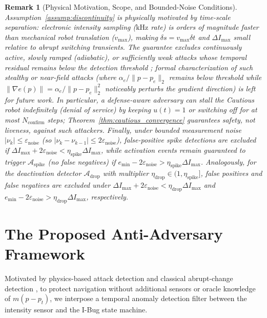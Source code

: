 \documentclass[12pt, a4paper]{article}
\newtheorem{remark}{Remark}
\begin{document}
\begin{remark}[Physical Motivation, Scope, and Bounded-Noise Conditions]
\label{rem:physical_justification}
Assumption~\ref{assump:discontinuity} is physically motivated by time-scale separation: electronic intensity sampling ($\text{kHz}$ rate) is orders of magnitude faster than mechanical robot translation ($v_{\max}$), making $\delta s = v_{\max}\delta t$ and $\Delta I_{\max}$ small relative to abrupt switching transients. The guarantee excludes continuously active, slowly ramped (adiabatic), or sufficiently weak attacks whose temporal residual remains below the detection threshold \cite{psiaki2016gnss}; formal characterization of such stealthy or near-field attacks (where $\alpha_e / \|p - p_e\|_2$ remains below threshold while $\|\nabla e(p)\| = \alpha_e / \|p - p_e\|_2^2$ noticeably perturbs the gradient direction) is left for future work. In particular, a defense-aware adversary can stall the Cautious robot indefinitely (denial of service) by keeping $u(t) = 1$ or switching off for at most $N_{\text{confirm}}$ steps; Theorem~\ref{thm:cautious_convergence} guarantees safety, not liveness, against such attackers. Finally, under bounded measurement noise $|\nu_k| \le \varepsilon_{\text{noise}}$ (so $|\nu_k - \nu_{k-1}| \le 2\varepsilon_{\text{noise}}$), false-positive spike detections are excluded if $\Delta I_{\max} + 2\varepsilon_{\text{noise}} < \eta_{\text{spike}}\Delta I_{\max}$, while activation events remain guaranteed to trigger $\mathcal{A}_{\text{spike}}$ (no false negatives) if $e_{\min} - 2\varepsilon_{\text{noise}} > \eta_{\text{spike}}\Delta I_{\max}$. Analogously, for the deactivation detector $\mathcal{A}_{\text{drop}}$ with multiplier $\eta_{\text{drop}} \in (1, \eta_{\text{spike}}]$, false positives and false negatives are excluded under $\Delta I_{\max} + 2\varepsilon_{\text{noise}} < \eta_{\text{drop}}\Delta I_{\max}$ and $e_{\min} - 2\varepsilon_{\text{noise}} > \eta_{\text{drop}}\Delta I_{\max}$, respectively.
\end{remark}

\section{The Proposed Anti-Adversary Framework}
\label{sec:algorithm}
Motivated by physics-based attack detection \cite{giraldo2018survey} and classical abrupt-change detection \cite{basseville1993detection}, to protect navigation without additional sensors or oracle knowledge of $m(p - p_t)$, we interpose a temporal anomaly detection filter between the intensity sensor and the I-Bug state machine.
\end{document}
